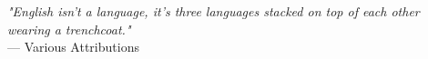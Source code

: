 \begin{flushright}
\emph{"English isn't a language, it's three languages stacked on top of each other wearing a trenchcoat."}\\
--- Various Attributions
\end{flushright}